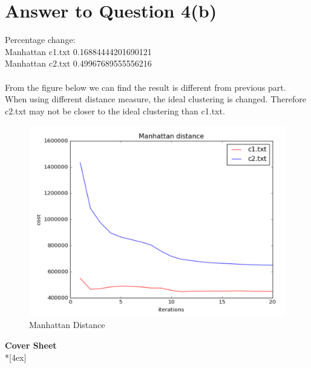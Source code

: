 \documentclass[11pt]{article}
\begin{document}
\pagebreak[4]
\section*{Answer to Question 4(b)}
Percentage change:\\
Manhattan c1.txt 0.16884444201690121\\
Manhattan c2.txt 0.49967689555556216\\
\\
From the figure below we can find the result is different from previous part. 
When using different distance measure, the ideal clustering is changed. Therefore c2.txt may not be closer to the ideal clustering than c1.txt.

\begin{figure}[h]
\center
\includegraphics[scale=0.7]{Manhattan.png}
\caption{Manhattan Distance}
\end{figure}

\pagebreak[4]
\begin{center}
\LARGE{\bf \textsf{Cover Sheet}} \\*[4ex]
\end{center}
\end{document}
